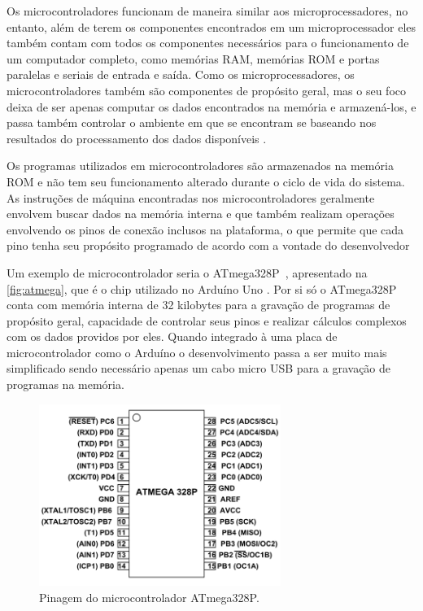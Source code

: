 Os microcontroladores funcionam de maneira similar aos microprocessadores, no entanto, além de terem os componentes encontrados em um microprocessador eles também contam com todos os componentes necessários para o funcionamento de um computador completo, como memórias RAM, memórias ROM e portas paralelas e seriais de entrada e saída. Como os microprocessadores, os microcontroladores também são componentes de propósito geral, mas o seu foco deixa de ser apenas computar os dados encontrados na memória e armazená-los, e passa também controlar o ambiente em que se encontram se baseando nos resultados do processamento dos dados disponíveis \cite{ayala:1991}.

Os programas utilizados em microcontroladores são armazenados na memória ROM e não tem seu funcionamento alterado durante o ciclo de vida do sistema. As instruções de máquina encontradas nos microcontroladores geralmente envolvem buscar dados na memória interna e que também realizam operações envolvendo os pinos de conexão inclusos na plataforma, o que permite que cada pino tenha seu propósito programado de acordo com a vontade do desenvolvedor \cite{ayala:1991}


Um exemplo de microcontrolador seria o ATmega328P~\cite{atmel}, apresentado na \autoref{fig:atmega},  que é o chip utilizado no Arduíno Uno \cite{arduino}. Por si só o ATmega328P conta com memória interna de 32 kilobytes para a gravação de programas de propósito geral, capacidade de controlar seus pinos e realizar cálculos complexos com os dados providos por eles. Quando integrado à uma placa de microcontrolador como o Arduíno o desenvolvimento passa a ser muito mais simplificado sendo necessário apenas um cabo micro USB para a gravação de programas na memória.

\begin{figure}[ht]
    \centering
    \includegraphics[width=0.7\textwidth, keepaspectratio]{resources/ATMega328P-Pinout.png}
    \caption{Pinagem do microcontrolador ATmega328P. \cite{atmel}}
    \label{fig:atmega}
\end{figure}

